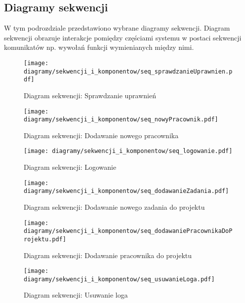 \subsection{Diagramy sekwencji}
\begin{adjustwidth}{2em}{0pt}

W tym podrozdziale przedstawiono wybrane diagramy sekwencji. Diagram sekwencji obrazuje interakcje pomiędzy częściami systemu w postaci sekwencji komunikatów np. wywołań funkcji wymienianych między nimi. 

\begin{figure}[H]
    \centering
    \texttt{[image: diagramy/sekwencji\_i\_komponentow/seq\_sprawdzanieUprawnien.pdf]}
    \caption{Diagram sekwencji: Sprawdzanie uprawnień}
    \label{fig:seq_sprawdzanieUprawnien.pdf}
\end{figure} 

\begin{figure}[H]
    \centering
    \texttt{[image: diagramy/sekwencji\_i\_komponentow/seq\_nowyPracownik.pdf]}
    \caption{Diagram sekwencji: Dodawanie nowego pracownika}
    \label{fig:seq_nowyPracownik.pdf}
\end{figure} 

\begin{figure}[H]
    \centering
    \texttt{[image: diagramy/sekwencji\_i\_komponentow/seq\_logowanie.pdf]}
    \caption{Diagram sekwencji: Logowanie}
    \label{fig:seq_logowanie.pdf}
\end{figure} 

\begin{figure}[H]
    \centering
    \texttt{[image: diagramy/sekwencji\_i\_komponentow/seq\_dodawanieZadania.pdf]}
    \caption{Diagram sekwencji: Dodawanie nowego zadania do projektu}
    \label{fig:seq_dodawanieZadania.pdf}
\end{figure} 

\begin{figure}[H]
    \centering
    \texttt{[image: diagramy/sekwencji\_i\_komponentow/seq\_dodawaniePracownikaDoProjektu.pdf]}
    \caption{Diagram sekwencji: Dodawanie pracownika do projektu}
    \label{fig:seq_dodawaniePracownikaDoProjektu.pdf}
\end{figure} 

\begin{figure}[H]
    \centering
    \texttt{[image: diagramy/sekwencji\_i\_komponentow/seq\_usuwanieLoga.pdf]}
    \caption{Diagram sekwencji: Usuwanie loga}
    \label{fig:seq_usuwanieLoga.pdf}
\end{figure} 

\end{adjustwidth}